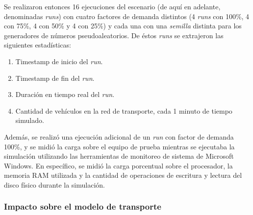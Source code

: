 Se realizaron entonces 16 ejecuciones del escenario (de aquí en adelante, denominadas \emph{runs}) con cuatro factores de demanda distintos (4 \emph{runs} con 100\%, 4 con 75\%, 4 con 50\% y 4 con 25\%) y cada una con una \emph{semilla} distinta para los generadores de números pseudoaleatorios. De éstos \emph{runs} se extrajeron las siguientes estadísticas:

\begin{enumerate}
    \item Timestamp de inicio del \emph{run}.
    \item Timestamp de fin del \emph{run}.
    \item Duración en tiempo real del \emph{run}.
    \item Cantidad de vehículos en la red de transporte, cada 1 minuto de tiempo simulado.
\end{enumerate}

Además, se realizó una ejecución adicional de un \emph{run} con factor de demanda 100\%, y se midió la carga sobre el equipo de prueba mientras se ejecutaba la simulación utilizando las herramientas de monitoreo de sistema de Microsoft Windows. En específico, se midió la carga porcentual sobre el procesador, la memoria RAM utilizada y la cantidad de operaciones de escritura y lectura del disco físico durante la simulación. 

\subsubsection{Impacto sobre el modelo de transporte}

